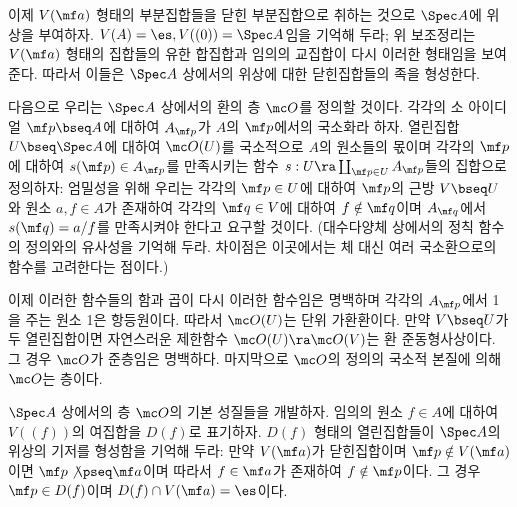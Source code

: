 	이제 $V(\mf a)$ 형태의 부분집합들을 닫힌 부분집합으로 취하는 것으로 $\Spec A$에 위상을 부여하자.
	$V(A)=\es,V((0))=\Spec A$임을 기억해 두라; 위 보조정리는 $V(\mf a)$ 형태의 집합들의 유한 합집합과
	임의의 교집합이 다시 이러한 형태임을 보여준다. 따라서 이들은 $\Spec A$ 상에서의 위상에 대한 닫힌집합들의 족을 형성한다.
	
	다음으로 우리는 $\Spec A$ 상에서의 환의 층 $\mc O$를 정의할 것이다. 각각의 소 아이디얼 $\mf p\bseq A$에 대하여
	$A_{\mf p}$가 $A$의 $\mf p$에서의 국소화라 하자. 열린집합 $U\bseq\Spec A$에 대하여 $\mc O(U)$를
	국소적으로 $A$의 원소들의 몫이며 각각의 $\mf p$에 대하여 $s(\mf p)\in A_{\mf p}$를 만족시키는
	함수 $s:U\ra\coprod_{\mf p\in U}A_{\mf p}$들의 집합으로 정의하자:
	엄밀성을 위해 우리는 각각의 $\mf p\in U$에 대하여 $\mf p$의 근방 $V\bseq U$와 원소 $a,f\in A$가 존재하여
	각각의 $\mf q\in V$에 대하여 $f\notin\mf q$이며 $A_{\mf q}$에서 $s(\mf q)=a/f$를 만족시켜야 한다고 요구할 것이다.
	(대수다양체 상에서의 정칙 함수의 정의와의 유사성을 기억해 두라.
	차이점은 이곳에서는 체 대신 여러 국소환으로의 함수를 고려한다는 점이다.)
	
	이제 이러한 함수들의 함과 곱이 다시 이러한 함수임은 명백하며 각각의 $A_{\mf p}$에서 1을 주는 원소 1은 항등원이다.
	따라서 $\mc O(U)$는 단위 가환환이다. 만약 $V\bseq U$가 두 열린집합이면
	자연스러운 제한함수 $\mc O(U)\ra\mc O(V)$는 환 준동형사상이다.
	그 경우 $\mc O$가 준층임은 명백하다. 마지막으로 $\mc O$의 정의의 국소적 본질에 의해 $\mc O$는 층이다.
	
	
	\begin{definition}
	\end{definition}
	
	$\Spec A$ 상에서의 층 $\mc O$의 기본 성질들을 개발하자.
	임의의 원소 $f\in A$에 대하여 $V((f))$의 여집합을 $D(f)$로 표기하자.
	$D(f)$ 형태의 열린집합들이 $\Spec A$의 위상의 기저를 형성함을 기억해 두라:
	만약 $V(\mf a)$가 닫힌집합이며 $\mf p\notin V(\mf a)$이면 $\mf p\not\pseq\mf a$이며
	따라서 $f\in\mf a$가 존재하여 $f\notin\mf p$이다. 그 경우 $\mf p\in D(f)$이며 $D(f)\cap V(\mf a)=\es$이다.
	
